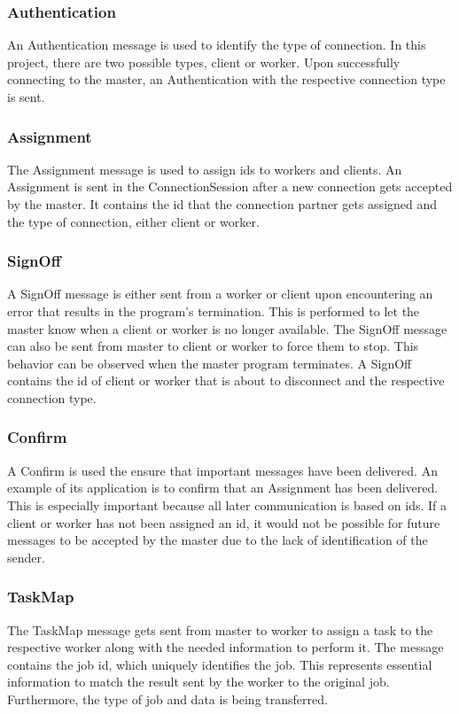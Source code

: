 \documentclass[12pt, letterpaper]{article}
\begin{document}
\subsubsection{Authentication}
An Authentication message is used to identify the type of connection. In this project, there are two possible types, client or worker. Upon successfully connecting to the master, an Authentication with the respective connection type is sent. 

\subsubsection{Assignment}
The Assignment message is used to assign ids to workers and clients. An Assignment is sent in the ConnectionSession after a new connection gets accepted by the master. It contains the id that the connection partner gets assigned and the type of connection, either client or worker.

\subsubsection{SignOff}
A SignOff message is either sent from a worker or client upon encountering an error that results in the program's termination. This is performed to let the master know when a client or worker is no longer available. The SignOff message can also be sent from master to client or worker to force them to stop. This behavior can be observed when the master program terminates. A SignOff contains the id of client or worker that is about to disconnect and the respective connection type.

\subsubsection{Confirm}
A Confirm is used the ensure that important messages have been delivered. An example of its application is to confirm that an Assignment has been delivered. This is especially important because all later communication is based on ids. If a client or worker has not been assigned an id, it would not be possible for future messages to be accepted by the master due to the lack of identification of the sender. 

\subsubsection{TaskMap}
The TaskMap message gets sent from master to worker to assign a task to the respective worker along with the needed information to perform it. The message contains the job id, which uniquely identifies the job. This represents essential information to match the result sent by the worker to the original job. Furthermore, the type of job and data is being transferred.
\end{document}
